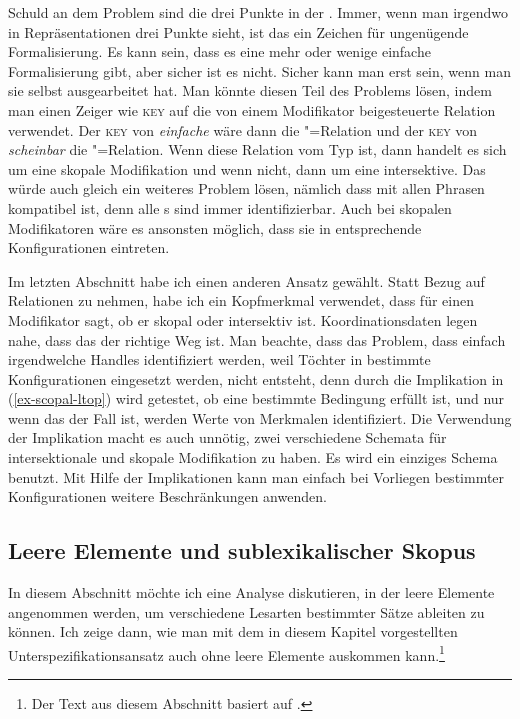 \z
Schuld an dem Problem sind die drei Punkte in der \relsl. Immer, wenn man irgendwo in Repräsentationen drei Punkte
sieht, ist das ein Zeichen für ungenügende Formalisierung. Es kann sein, dass es eine mehr oder
wenige einfache Formalisierung gibt, aber sicher ist es nicht. Sicher kann man erst sein, wenn man
sie selbst ausgearbeitet hat. Man könnte diesen Teil des Problems lösen, indem man einen Zeiger wie
\textsc{key} auf die von einem Modifikator beigesteuerte Relation verwendet. Der \textsc{key} von \emph{einfache} wäre
dann die "=Relation und der \textsc{key} von \emph{scheinbar} die
"=Relation. Wenn diese Relation vom Typ  ist, dann handelt es
sich um eine skopale Modifikation und wenn nicht, dann um eine intersektive. Das würde auch gleich
ein weiteres Problem lösen, nämlich dass  mit allen Phrasen kompatibel
ist, denn alle \ltop{}s sind immer identifizierbar. Auch bei skopalen Modifikatoren wäre es
ansonsten möglich, dass sie in entsprechende Konfigurationen eintreten. 

Im letzten Abschnitt habe ich einen anderen Ansatz gewählt. Statt Bezug auf Relationen zu nehmen,
habe ich ein Kopfmerkmal verwendet, dass für einen Modifikator sagt, ob er skopal oder intersektiv
ist. Koordinationsdaten legen nahe, dass das der richtige Weg ist. Man beachte, dass das Problem,
dass einfach irgendwelche Handles identifiziert werden, weil Töchter in bestimmte Konfigurationen
eingesetzt werden, nicht entsteht, denn durch die Implikation in (\ref{ex-scopal-ltop}) wird getestet, ob eine
bestimmte Bedingung erfüllt ist, und nur wenn das der Fall ist, werden Werte von Merkmalen
identifiziert. Die Verwendung der Implikation macht es auch unnötig, zwei verschiedene Schemata für
intersektionale und skopale Modifikation zu haben. Es wird ein einziges Schema benutzt. Mit Hilfe
der Implikationen kann man einfach bei Vorliegen bestimmter Konfigurationen weitere Beschränkungen anwenden.

\subsection{Leere Elemente und sublexikalischer Skopus}

In diesem Abschnitt möchte ich eine Analyse diskutieren, in der leere Elemente angenommen werden, um
verschiedene Lesarten bestimmter Sätze ableiten zu können. Ich zeige dann, wie man mit dem in diesem
Kapitel vorgestellten Unterspezifikationsansatz auch ohne leere Elemente auskommen
kann.\footnote{Der Text aus diesem Abschnitt basiert auf \citet[Abschnitt~11.9.2]{MuellerGTBuch1}.}

